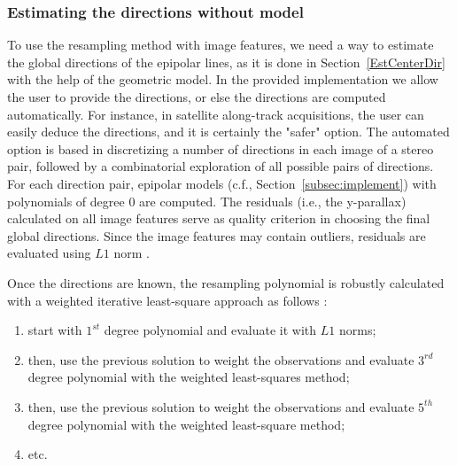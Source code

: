 \documentclass{ipol}
\newcommand{\mpd}[1]{\textcolor{magenta}{#1}}
\begin{document}
\subsubsection{Estimating the directions without model}
%
To use the resampling method with image features, we need a way to estimate the global directions of the epipolar lines, as it is done in Section~\ref{EstCenterDir} with the help of the geometric model. In the provided implementation we allow the user to provide the directions, or else the directions are computed automatically. For instance, in satellite along-track acquisitions, the user can easily deduce the directions, and it is certainly the "safer" option. The automated option is based in discretizing a number of directions in each image of a stereo pair, followed by a combinatorial exploration of all possible pairs of directions. For each direction pair, epipolar models (c.f., Section~\ref{subsec:implement}) with polynomials of degree $0$ are computed. The residuals (i.e., the y-parallax) calculated on all image features serve as quality criterion in choosing the final global directions. { Since the image features may contain outliers, residuals are evaluated using $L1$ norm .}


{Once the directions are known, the resampling polynomial is robustly calculated with a weighted iterative least-square approach as follows :}

{
\begin{enumerate}
   \item start with $1^{st}$ degree polynomial and evaluate it with $L1$ norms;
   \item then, use the previous solution to weight the observations and evaluate $3^{rd}$ degree polynomial with the weighted least-squares method;
   \item then, use the previous solution to weight the observations and evaluate $5^{th}$ degree polynomial with the weighted least-square method;
   \item  etc. 
\end{enumerate}}




\end{document}
